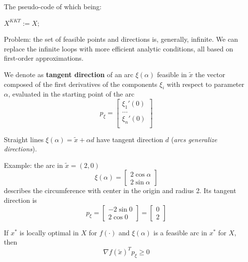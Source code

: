 The pseudo-code of which being:
\begin{myalgo}{0.85}
	$X^{KKT} := X$; \\
\end{myalgo}

Problem: the set of feasible points and directions is, generally, infinite. We can replace the infinite loops with more efficient analytic conditions, all based on first-order approximations. \\

\begin{definition}
	We denote as \textbf{tangent direction} of an arc $\xi (\alpha)$ feasible in $\tilde x$ the vector composed of the first derivatives of the components $\xi_i$ with respect to parameter $\alpha$, evaluated in the starting point of the arc
	$$ p_\xi = \left[\begin{array}{c}
		\xi_1'(0) \\ \dots \\ \xi_n'(0) \\
	\end{array}\right]$$
\end{definition}

Straight lines $\xi (\alpha) = \tilde x + \alpha d$ have tangent direction $d$ (\textit{arcs generalize directions}).

Example: the arc in $\tilde x = (2,0)$
$$ \xi (\alpha) = \left[\begin{array}{c}
	2 \cos \alpha \\ 2 \sin \alpha 
\end{array}\right] $$
describes the circumference with center in the origin and radius 2. Its tangent direction is 
$$ p_\xi = \left[\begin{array}{c}
	-2 \sin 0 \\ 2 \cos 0
\end{array} \right] = \left[ \begin{array}{c}
0 \\ 2
\end{array}\right] $$

\begin{theo}
	If $x^\ast$ is locally optimal in $X$ for $f(\cdot)$ and $\xi (\alpha)$ is a feasible arc in $x^\ast$ for $X$, then 
	$$ \nabla f (\tilde x)^T p_\xi \geq 0 $$
\end{theo}

